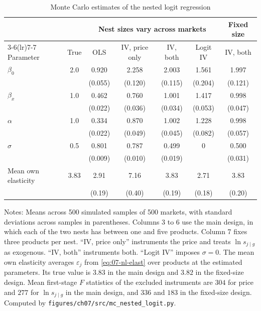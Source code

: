 \begin{table}[htbp]
\centering
\caption{Monte Carlo estimates of the nested logit regression}\label{tab:07-mc-nl}
\small
\begin{tabular}{@{}lcccccc@{}}
\toprule
 & & \multicolumn{4}{c}{Nest sizes vary across markets} & Fixed size \\
\cmidrule(lr){3-6}\cmidrule(lr){7-7}
Parameter & True & OLS & IV, price only & IV, both & Logit IV & IV, both \\
\midrule
$\beta_0$ & 2.0 & 0.920 & 2.258 & 2.003 & 1.561 & 1.997 \\
 & & (0.055) & (0.120) & (0.115) & (0.204) & (0.121) \\
$\beta_x$ & 1.0 & 0.462 & 0.760 & 1.001 & 1.417 & 0.998 \\
 & & (0.022) & (0.036) & (0.034) & (0.053) & (0.047) \\
$\alpha$ & 1.0 & 0.334 & 0.870 & 1.002 & 1.228 & 0.998 \\
 & & (0.022) & (0.049) & (0.045) & (0.082) & (0.057) \\
$\sigma$ & 0.5 & 0.801 & 0.787 & 0.499 & 0 & 0.500 \\
 & & (0.009) & (0.010) & (0.019) &  & (0.031) \\
\addlinespace
Mean own elasticity & 3.83 & 2.91 & 7.16 & 3.83 & 2.71 & 3.83 \\
 & & (0.19) & (0.40) & (0.19) & (0.18) & (0.20) \\
\bottomrule
\end{tabular}
\par\smallskip
\begin{minipage}{0.95\textwidth}
\footnotesize Notes: Means across 500 simulated samples of 500 markets, with standard deviations across samples
in parentheses. Columns 3 to 6 use the main design, in which each of the two nests has between one and five
products. Column 7 fixes three products per nest. ``IV, price only'' instruments the price and treats
$\ln s_{j \mid g}$ as exogenous. ``IV, both'' instruments both. ``Logit IV'' imposes $\sigma = 0$. The mean own
elasticity averages $\varepsilon_j$ from \eqref{eq:07-nl-elast} over products at the estimated parameters. Its
true value is $3.83$ in the main design and $3.82$ in the fixed-size design. Mean first-stage $F$ statistics of
the excluded instruments are $304$ for price and $277$ for $\ln s_{j \mid g}$ in the main design, and $336$ and
$183$ in the fixed-size design. Computed by \texttt{figures/ch07/src/mc\_nested\_logit.py}.
\end{minipage}
\end{table}

